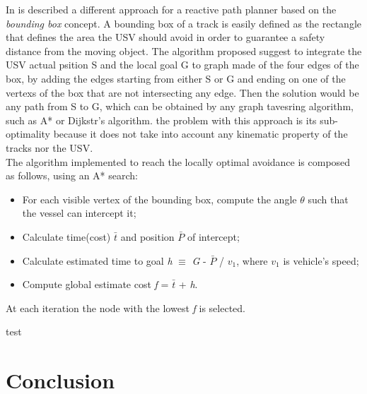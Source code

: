 \documentclass[journal]{IEEEtran}
\begin{document}
  \indent In \cite{Casalino2009} is described a different approach for a reactive path planner based on the \textit{bounding box} concept. A bounding box of a track is easily defined as the rectangle that defines the area the USV should avoid in order to guarantee a safety distance from the moving object. The algorithm proposed suggest to integrate the USV actual psition S and the local goal G to  graph made of the four edges of the box, by adding the edges starting from either S or G and ending on one of the vertexs of the box that are not intersecting any edge. Then the solution would be any path from S to G, which can be obtained by any graph tavesring algorithm, such as A* or Dijkstr's algorithm. the problem with this approach is its sub-optimality because it does not take into account any kinematic property of the tracks nor the USV.\\
  The algorithm implemented to reach the locally optimal avoidance is composed as follows, using an A* search:
  \begin{itemize}
        \item For each visible vertex of the bounding box, compute the angle $\theta$ such that the vessel can intercept it;
        \item Calculate time(cost) \textit{$\bar{t}$} and position $\bar{P}$ of intercept;
        \item Calculate estimated time to goal \textit{h} $\equiv$ \textit{G} - \textit{$\bar{P}$} / \textit{$v_1$}, where \textit{$v_1$} is vehicle's speed;
        \item Compute global estimate cost \textit{f} = \textit{$\bar{t}$} + \textit{h}.
  \end{itemize}
  At each iteration the node with the lowest \textit{f} is selected.

  test

\section{Conclusion} \label{conclusion}



\ifCLASSOPTIONcaptionsoff
  \newpage
\fi


%
%
%







\end{document}

